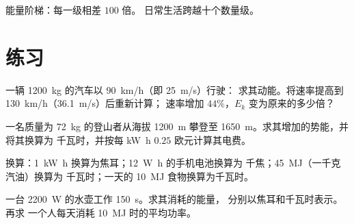 \begin{omfigure}

{\small 能量阶梯：每一级相差 $100$ 倍。
日常生活跨越十个数量级。}
\end{omfigure}

\section{练习}

\begin{exercise}[$\star$]\label{exo:g10:energy-conservation:1}
一辆 \qty{1200}{kg} 的汽车以 \qty{90}{km/h}（即 \qty{25}{m/s}）行驶：
求其动能。将速率提高到 \qty{130}{km/h}（\qty{36.1}{m/s}）后重新计算；
速率增加 $44\%$，$E_k$ 变为原来的多少倍？
\end{exercise}

\begin{exercise}[$\star$]\label{exo:g10:energy-conservation:2}
一名质量为 \qty{72}{kg} 的登山者从海拔 \qty{1200}{m} 攀登至
\qty{1650}{m}。求其增加的势能，并将其换算为
千瓦时，并按每 \unit{kW.h} $0.25$ 欧元计算其电费。
\end{exercise}

\begin{exercise}[$\star$]\label{exo:g10:energy-conservation:3}
换算：\qty{1}{kW.h} 换算为焦耳；\qty{12}{W.h} 的手机电池换算为
千焦；\qty{45}{MJ}（一千克汽油）换算为
千瓦时；一天的 \qty{10}{MJ} 食物换算为千瓦时。
\end{exercise}

\begin{exercise}[$\star$]\label{exo:g10:energy-conservation:4}
一台 \qty{2200}{W} 的水壶工作 \qty{150}{s}。求其消耗的能量，
分别以焦耳和千瓦时表示。再求
一个人每天消耗 \qty{10}{MJ} 时的平均功率。
\end{exercise}

